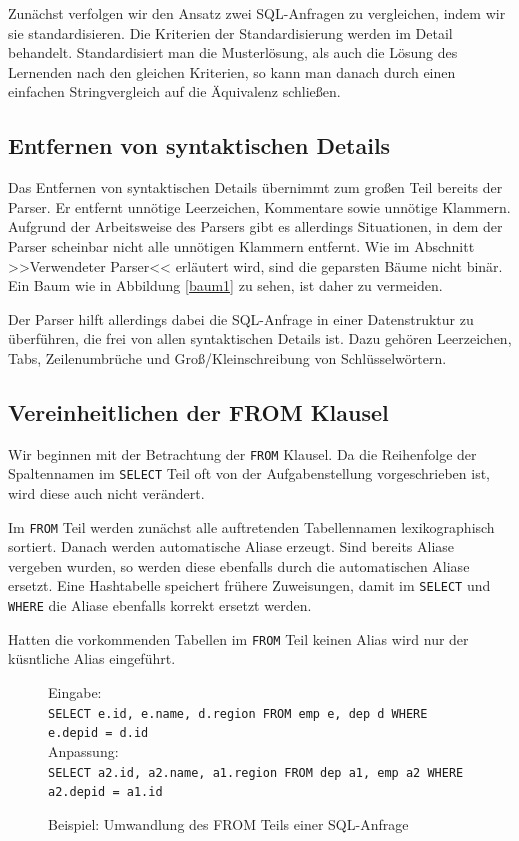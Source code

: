 Zunächst verfolgen wir den Ansatz zwei SQL-Anfragen zu vergleichen, indem wir sie standardisieren. Die Kriterien der Standardisierung werden im Detail behandelt. Standardisiert man die Musterlösung, als auch die Lösung des Lernenden nach den gleichen Kriterien, so kann man danach durch einen einfachen Stringvergleich auf die Äquivalenz schließen. 

\subsection{Entfernen von syntaktischen Details}

Das Entfernen von syntaktischen Details übernimmt zum großen Teil bereits der Parser. Er entfernt unnötige Leerzeichen, Kommentare sowie unnötige Klammern. Aufgrund der Arbeitsweise des Parsers gibt es allerdings Situationen, in dem der Parser scheinbar nicht alle unnötigen Klammern entfernt. Wie im Abschnitt >>Verwendeter Parser<< erläutert wird, sind die geparsten Bäume nicht binär. Ein Baum wie in Abbildung \ref{baum1} zu sehen, ist daher zu vermeiden. 

Der Parser hilft allerdings dabei die SQL-Anfrage in einer Datenstruktur zu überführen, die frei von allen syntaktischen Details ist. Dazu gehören Leerzeichen, Tabs, Zeilenumbrüche und Groß/Kleinschreibung von Schlüsselwörtern.

\subsection{Vereinheitlichen der FROM Klausel}

Wir beginnen mit der Betrachtung der \verb|FROM| Klausel. Da die Reihenfolge der Spaltennamen im \verb|SELECT| Teil oft von der Aufgabenstellung vorgeschrieben ist, wird diese auch nicht verändert.

Im \verb|FROM| Teil werden zunächst alle auftretenden Tabellennamen lexikographisch sortiert. Danach werden automatische Aliase erzeugt. Sind bereits Aliase vergeben wurden, so werden diese ebenfalls durch die automatischen Aliase ersetzt. Eine Hashtabelle speichert frühere Zuweisungen, damit im \verb|SELECT| und \verb|WHERE| die Aliase ebenfalls korrekt ersetzt werden.

Hatten die vorkommenden Tabellen im \verb|FROM| Teil keinen Alias wird nur der küsntliche Alias eingeführt.

\begin{figure}
Eingabe: \\\verb|SELECT e.id, e.name, d.region FROM emp e, dep d WHERE e.depid = d.id|\\

Anpassung: \\\verb|SELECT a2.id, a2.name, a1.region FROM dep a1, emp a2 WHERE a2.depid = a1.id|\\
\caption{Beispiel: Umwandlung des FROM Teils einer SQL-Anfrage}
\end{figure}

